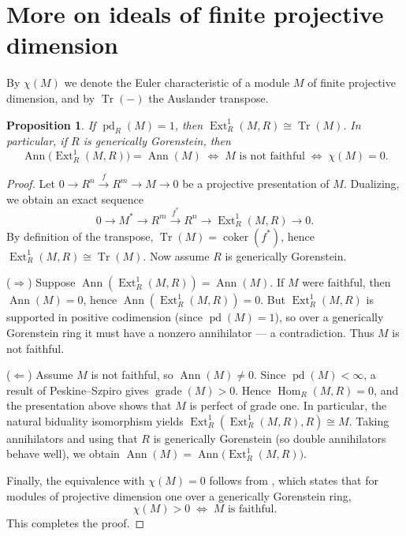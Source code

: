 \documentclass[11pt,a4paper]{amsart}
\numberwithin{equation}{section}
\newtheorem{proposition}[theorem]{Proposition}
\DeclareMathOperator{\coker}{coker}
\DeclareMathOperator{\grade}{grade}
\DeclareMathOperator{\Ann}{Ann}\DeclareMathOperator{\ann}{Ann}
\DeclareMathOperator{\Tr}{Tr}\DeclareMathOperator{\tr}{tr}
\DeclareMathOperator{\pd}{pd}
\DeclareMathOperator{\Ext}{Ext}
\DeclareMathOperator{\Hom}{Hom}
\begin{document}
	\maketitle




\section{More on ideals of finite projective dimension}
By $\chi(M)$ we denote the Euler characteristic of a module $M$ of finite projective dimension, and by $\Tr(-)$ the Auslander transpose.

\begin{proposition}
	If $\pd_R(M)=1$, then
	\(
	\Ext^1_R(M,R)\cong \Tr(M).
	\)
	In particular, if $R$ is generically Gorenstein, then
	\[
	\Ann\!\big(\Ext^1_R(M,R)\big)=\Ann(M)
	\;\Longleftrightarrow\;
	M \text{ is not faithful}
	\;\Longleftrightarrow\;
	\chi(M)=0 .
	\]
\end{proposition}

\begin{proof}
	Let
	\(
	0 \rightarrow R^n \xrightarrow{f} R^m \rightarrow M \rightarrow 0
	\)
	be a projective presentation of $M$. Dualizing, we obtain an exact sequence
	\[
	0 \longrightarrow M^* \longrightarrow R^m \xrightarrow{f^*} R^n \longrightarrow \Ext^1_R(M,R) \longrightarrow 0.
	\]
	By definition of the transpose, $\Tr(M)=\coker(f^*)$, hence
	\(
	\Ext^1_R(M,R)\cong \Tr(M).
	\)
	Now assume $R$ is generically Gorenstein.

	($\Rightarrow$)
	Suppose $\Ann(\Ext^1_R(M,R))=\Ann(M)$. If $M$ were faithful, then $\Ann(M)=0$, hence $\Ann(\Ext^1_R(M,R))=0$. But $\Ext^1_R(M,R)$ is supported in positive codimension (since $\pd(M)=1$), so over a generically Gorenstein ring it must have a nonzero annihilator — a contradiction. Thus $M$ is not faithful.
	
	\medskip
	\noindent
	($\Leftarrow$)
	Assume $M$ is not faithful, so $\Ann(M)\neq 0$. Since $\pd(M)<\infty$, a result of Peskine–Szpiro \cite[I.4.14]{PS} gives $\grade(M)>0$. Hence $\Hom_R(M,R)=0$, and the presentation above shows that $M$ is perfect of grade one. In particular, the natural biduality isomorphism yields
	\(
	\Ext^1_R(\Ext^1_R(M,R),R)\cong M.
	\)
	Taking annihilators and using that $R$ is generically Gorenstein (so double annihilators behave well), we obtain
	\(
	\Ann(M)=\Ann\!\big(\Ext^1_R(M,R)\big).
	\)

	Finally, the equivalence with $\chi(M)=0$ follows from \cite[Proposition 2.26]{wol}, which states that for modules of projective dimension one over a generically Gorenstein ring,
	\[
	\chi(M)>0 \;\Longleftrightarrow\; M \text{ is faithful}.
	\]
	This completes the proof.
\end{proof}
\end{document}
